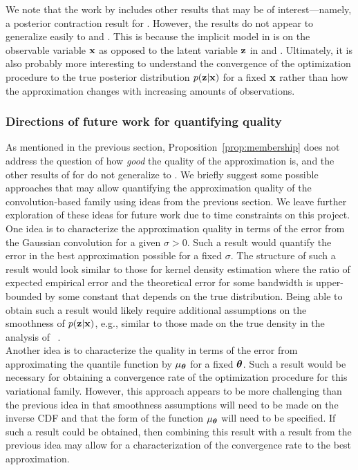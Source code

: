 \documentclass[10pt]{article}
\begin{document}
We note that the work by \citet{Plummer:2021} includes other results that may be of interest---namely, a posterior contraction result for \nllvm. However, the results do not appear to generalize easily to \sivi and \uivi. This is because the implicit model in \nllvm is on the observable variable $\mathbf{x}$ as opposed to the latent variable $\mathbf{z}$ in \sivi and \uivi. Ultimately, it is also probably more interesting to understand the convergence of the \uivi optimization procedure to the true posterior distribution $p(\mathbf{z}|\mathbf{x})$ for a fixed $\mathbf{x}$ rather than how the approximation changes with increasing amounts of observations.


\subsubsection{Directions of future work for quantifying quality} \label{sec:future:approximation}

As mentioned in the previous section, Proposition~\ref{prop:membership} does not address the question of how \textit{good} the quality of the \uivi approximation is, and the other results of \citet{Plummer:2021} for \nllvm do not generalize to \uivi. We briefly suggest some possible approaches that may allow quantifying the approximation quality of the convolution-based family using ideas from the previous section. We leave further exploration of these ideas for future work due to time constraints on this project.
\\

One idea is to characterize the approximation quality in terms of the error from the Gaussian convolution for a given $\sigma>0$. Such a result would quantify the error in the best approximation possible for a fixed $\sigma$. The structure of such a result would look similar to those for kernel density estimation \citep[e.g.,][Section~9.5, Chapter~11]{Devroye:2001} where the ratio of expected empirical error and the theoretical error for some bandwidth is upper-bounded by some constant that depends on the true distribution. Being able to obtain such a result would likely require additional assumptions on the smoothness of $p(\mathbf{z}|\mathbf{x})$, e.g., similar to those made on the true density in the analysis of \nllvm~\citep{Plummer:2021}.
\\

Another idea is to characterize the quality in terms of the error from approximating the quantile function by $\mu_{\bm{\theta}}$ for a fixed ${\bm{\theta}}$. Such a result would be necessary for obtaining a convergence rate of the \uivi optimization procedure for this variational family. However, this approach appears to be more challenging than the previous idea in that smoothness assumptions will need to be made on the inverse CDF and that the form of the function $\mu_{\bm{\theta}}$ will need to be specified. If such a result could be obtained, then combining this result with a result from the previous idea may allow for a characterization of the convergence rate to the \uivi best approximation.
\end{document}
